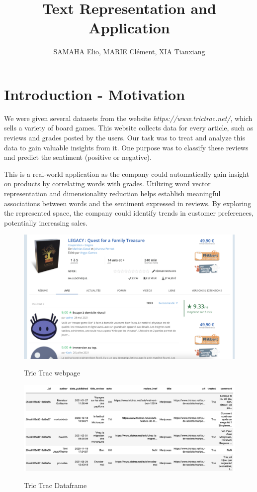 \documentclass{article}
\title{Text Representation and Application}
\author{SAMAHA Elio, MARIE Clément, XIA Tianxiang}
\begin{document}
\maketitle
\tableofcontents
\newpage
\section{Introduction - Motivation}
We were given several datasets from the website \textit{https://www.trictrac.net/}, which sells a variety of board games. This website collects data for every article, such as reviews and grades posted by the users. Our task was to treat and analyze this data to gain valuable insights from it. One purpose was to classify these reviews and predict the sentiment (positive or negative).

This is a real-world application as the company could automatically gain insight on products by correlating words with grades. Utilizing word vector representation and dimensionality reduction helps establish meaningful associations between words and the sentiment expressed in reviews. By exploring the represented space, the company could identify trends in customer preferences, potentially increasing sales.

\begin{figure}[H]
  \centering
  \begin{minipage}[t]{0.8\linewidth}
    \centering
    \includegraphics[width=0.8\linewidth]{tric_trac_pic.png}
    \caption{Tric Trac webpage}
    \vspace{0.5cm}
    \label{fig:tric_trac_webpage}
  \end{minipage}
  
  \begin{minipage}[t]{0.8\linewidth}
    \centering
    \includegraphics[width=1.2\linewidth]{tric_trac_df.png}
    \caption{Tric Trac Dataframe}
    \vspace{0.5cm}
    \label{fig:tric_trac_dataframe}
  \end{minipage}
\end{figure}
\end{document}
